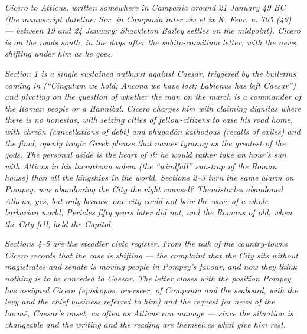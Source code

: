 
\textit{Cicero to Atticus, written somewhere in
Campania around 21 January 49 BC (the manuscript
dateline: \textit{Scr. in Campania inter xiv et ix
K. Febr. a. 705 (49)} --- between 19 and 24 January;
Shackleton Bailey settles on the midpoint). Cicero is
on the roads south, in the days after the
\emph{subito-consilium} letter, with the news shifting
under him as he goes.}

\textit{Section 1 is a single sustained outburst against
Caesar, triggered by the bulletins coming in
(``Cingulum we hold; Ancona we have lost; Labienus has
left Caesar'') and pivoting on the question of whether
the man on the march is a commander of the Roman people
or a Hannibal. Cicero charges him with claiming
\emph{dignitas} where there is no \emph{honestas}, with
seizing cities of fellow-citizens to ease his road home,
with \emph{chreōn} (cancellations of debt) and
\emph{phugadōn kathodous} (recalls of exiles) and the
final, openly tragic Greek phrase that names tyranny as
the greatest of the gods. The personal aside is the
heart of it: he would rather take an hour's sun with
Atticus in his \emph{lucrativum solem} (the ``windfall''
sun-trap of the Roman house) than all the kingships in
the world. Sections 2--3 turn the same alarm on
Pompey: was abandoning the City the right counsel?
Themistocles abandoned Athens, yes, but only because
one city could not bear the wave of a whole barbarian
world; Pericles fifty years later did not, and the
Romans of old, when the City fell, held the Capitol.}

\textit{Sections 4--5 are the steadier civic register.
From the talk of the country-towns Cicero records that
the case is shifting --- the complaint that the City
sits without magistrates and senate is moving people in
Pompey's favour, and now they think nothing is to be
conceded to Caesar. The letter closes with the position
Pompey has assigned Cicero (\emph{episkopos}, overseer,
of Campania and the seaboard, with the levy and the
chief business referred to him) and the request for
news of the \emph{hormē}, Caesar's onset, as often as
Atticus can manage --- since the situation is changeable
and the writing and the reading are themselves what give
him rest.}
